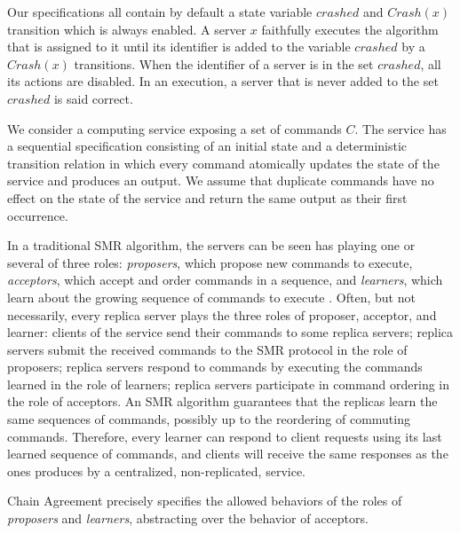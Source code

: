 Our specifications all contain by default a state variable $crashed$ and
$Crash\left( x \right)$ transition which is always enabled. A server $x$ faithfully
executes the algorithm that is assigned to it until its identifier is added to
the variable $crashed$ by a $Crash\left( x \right)$ transitions.  When the identifier of a
server is in the set $crashed$, all its actions are disabled.  In an execution,
a server that is never added to the set $crashed$ is said correct.

We consider a computing service exposing a set of commands $C$. The
service has a sequential specification consisting of an initial state
and a deterministic transition relation in which every command
atomically updates the state of the service and produces an output. We
assume that duplicate commands have no effect on the state of the
service and return the same output as their first occurrence.

In a traditional SMR algorithm, the servers can be seen has playing one or
several of three roles: \emph{proposers}, which propose new commands to execute,
\emph{acceptors}, which accept and order commands in a sequence, and
\emph{learners}, which learn about the growing sequence of commands to
execute \cite{lamport2001paxos}. Often, but not necessarily, every replica server plays the
three roles of proposer, acceptor, and learner: clients of the service
send their commands to some replica servers; replica servers submit
the received commands to the SMR protocol in the role of proposers;
replica servers respond to commands by executing the commands learned
in the role of learners; replica servers participate in command
ordering in the role of acceptors.  An SMR algorithm guarantees that
the replicas learn the same sequences of commands, possibly up to the
reordering of commuting commands. Therefore, every learner can respond to client
requests using its last learned sequence of commands, and clients will receive
the same responses as the ones produces by a centralized, non-replicated,
service. 

Chain Agreement precisely specifies the allowed behaviors of the roles of \emph{proposers}
and \emph{learners}, abstracting over the behavior of acceptors. 

